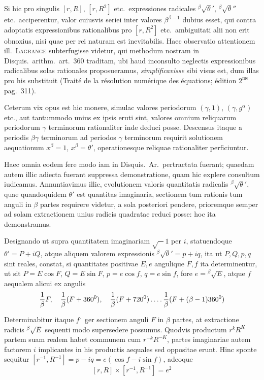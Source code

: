 Si hic pro singulis $[r,R]$, $[r,R^2]$ etc.\ expressiones radicales ${}^{\beta}\!\surd\theta'$, ${}^{\beta}\!\surd\theta''$ etc.\ acciperentur, valor cuiusvis seriei inter valores $\beta^{\beta-1}$ dubius esset, qui contra adoptatis expressionibus rationalibus pro $[r,R^2]$ etc.\ ambiguitati alii non erit obnoxius, nisi quae per rei naturam est inevitabilis. Haec observatio attentionem ill.\ \textsc{Lagrange} subterfugisse videtur, qui methodum nostram in Disquis.\ arithm.\ art.\ 360 traditam, ubi haud inconsulto neglectis expressionibus radicalibus solas rationales proposueramus, \emph{simplificavisse} sibi visus est, dum illas pro his substituit (Traité de la résolution numérique des équations; édition $2^{\mathrm{me}}$ pag.\ 311).

Ceterum vix opus est hic monere, simulac valores periodorum $(\gamma,1)$, $(\gamma,g^\alpha)$ etc., aut tantummodo unius ex ipsis eruti sint, valores omnium reliquarum periodorum $\gamma$ terminorum rationaliter inde deduci posse. Descensus itaque a periodis $\beta\gamma$ terminorum ad periodos $\gamma$ terminorum requirit solutionem aequationum $x^\beta=1$, $x^\beta=\theta'$, operationesque reliquae rationaliter perficiuntur.

%
Haec omnia eodem fere modo iam in Disquis.\ Ar.\ pertractata fuerant; quaedam autem illic adiecta fuerant suppressa demonstratione, quam hic explere consultum iudicamus. Annuntiavimus illic, evolutionem valoris quantitatis radicalis ${}^{\beta}\!\surd\theta'$, quae quandoquidem $\theta'$ est quantitas imaginaria, sectionem tum rationis tum anguli in $\beta$ partes requirere videtur, a sola posteriori pendere, prioremque semper ad solam extractionem unius radicis quadratae reduci posse: hoc ita demonstramus.

Designando ut supra quantitatem imaginariam $\surd-1$ per $i$, statuendoque $\theta'=P+iQ$, atque aliquem valorem expressionis ${}^{\beta}\!\surd\theta'=p+iq$, ita ut $P,Q,p,q$ sint reales, constat, si quantitates positivae $E,e$ angulique $F,f$ ita determinentur, ut sit $P=E\cos F$, $Q=E\sin F$, $p=e\cos f$, $q=e\sin f$, fore $e={}^{\beta}\!\surd E$, atque $f$ aequalem alicui ex angulis
\[
\frac1\beta F,\quad\frac1\beta(F+360^0),\quad\frac1\beta(F+720^0)\mathinner{.\,.\,.\,.}\frac1\beta(F+(\beta-1)360^0)
\]
Determinabitur itaque $f$\textsuperscript{.}\ ger sectionem anguli $F$ in $\beta$ partes, at extractione radicis ${}^{\beta}\!\surd E$ sequenti modo supersedere possumus. Quodvis productum $r^kR^K$ partem suam realem habet communem cum $r^{-k}R^{-K}$, partes imaginariae autem factorem $i$ implicantes in his productis aequales sed oppositae erunt. Hinc sponte sequitur $[r^{-1},R^{-1}]=p-iq=e(\cos f-i\sin f)$, adeoque
\[
[r,R]\times[r^{-1},R^{-1}]=e^2
\]

